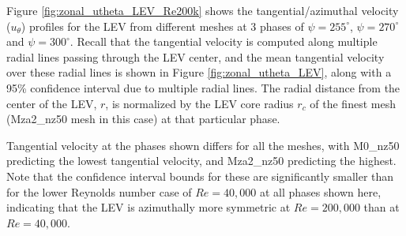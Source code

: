 Figure \ref{fig:zonal_utheta_LEV_Re200k} shows the tangential/azimuthal velocity ($u_{\theta}$) profiles for the LEV from different meshes at 3 phases of $\psi = 255^\circ$,  $\psi = 270^\circ$ and  $\psi = 300^\circ$. 
Recall that the tangential velocity is computed along multiple radial lines passing through the LEV center, and the mean tangential velocity over these radial lines is shown in Figure \ref{fig:zonal_utheta_LEV}, along with a 95\% confidence interval due to multiple radial lines.
The radial distance from the center of the LEV, $r$, is normalized by the LEV core radius $r_c$ of the finest mesh (Mza2\_nz50 mesh in this case) at that particular phase.

Tangential velocity at the phases shown differs for all the meshes, with M0\_nz50 predicting the lowest tangential velocity, and Mza2\_nz50 predicting the highest.
Note that the confidence interval bounds for these are significantly smaller than for the lower Reynolds number case of $Re=40,000$ at all phases shown here, indicating that the LEV is azimuthally more symmetric at $Re=200,000$ than at $Re=40,000$.

